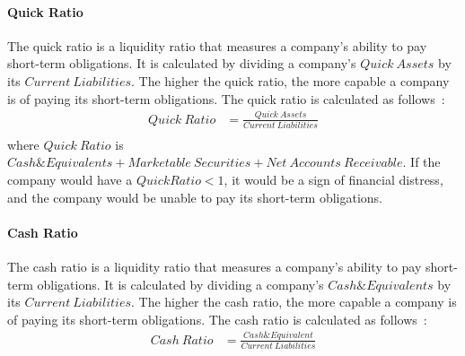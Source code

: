 \documentclass[../xlapes02]{subfiles}
\begin{document}
    \paragraph{Quick Ratio}\label{par:quick-ratio}
    The quick ratio is a liquidity ratio that measures a company's ability to pay short-term obligations. It is calculated by dividing a company's $Quick\ Assets$ by its $Current\ Liabilities$. The higher the quick ratio, the more capable a company is of paying its short-term obligations. The quick ratio is calculated as follows~\cite{investopedia}:
    \begin{equation}
        \begin{split}
            Quick\ Ratio&=\frac{Quick\ Assets}{Current\ Liabilities}\\
        \end{split}
    \end{equation}
    where $Quick\ Ratio$ is $Cash\&Equivalents+Marketable\ Securities+Net\ Accounts\ Receivable$. If the company would have a $Quick Ratio < 1$, it would be a sign of financial distress, and the company would be unable to pay its short-term obligations.

    \paragraph{Cash Ratio}\label{par:cash-ratio}
    The cash ratio is a liquidity ratio that measures a company's ability to pay short-term obligations. It is calculated by dividing a company's $Cash\&Equivalents$ by its $Current\ Liabilities$. The higher the cash ratio, the more capable a company is of paying its short-term obligations. The cash ratio is calculated as follows~\cite{investopedia}:
    \begin{equation}
        \begin{split}
            Cash\ Ratio&=\frac{Cash\&Equivalent}{Current\ Liabilities}\\
        \end{split}
    \end{equation}
\end{document}
